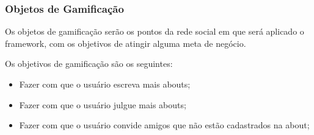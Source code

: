 \subsubsection{Objetos de Gamificação}
\label{sec:objetodegamificacao}
Os objetos de gamificação serão os pontos da rede social em que será aplicado o framework,
com os objetivos de atingir alguma meta de negócio.

Os objetivos de gamificação são os seguintes:

\begin{itemize}
    \item Fazer com que o usuário escreva mais abouts;
    \item Fazer com que o usuário julgue mais abouts;
    \item Fazer com que o usuário convide amigos que não estão cadastrados na about;
\end{itemize}

